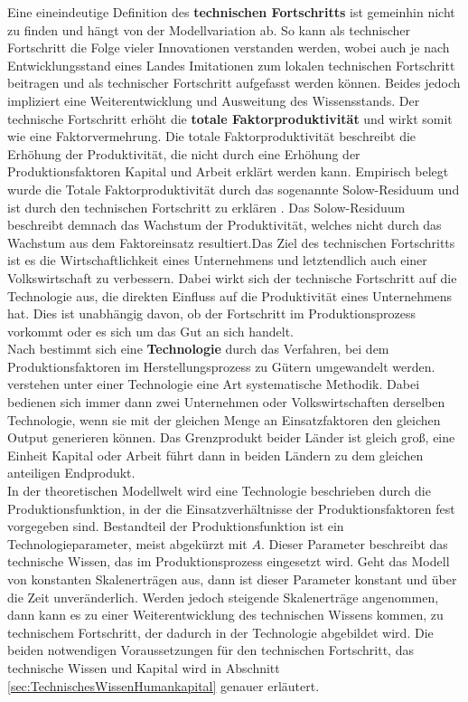 Eine eineindeutige Definition des \textbf{technischen Fortschritts} ist gemeinhin nicht zu finden und h{\"a}ngt von der Modellvariation ab. So kann als technischer Fortschritt die Folge vieler Innovationen verstanden werden, wobei auch je nach Entwicklungsstand eines Landes Imitationen zum lokalen technischen Fortschritt beitragen und als technischer Fortschritt aufgefasst werden können. Beides jedoch impliziert eine Weiterentwicklung und Ausweitung des Wissensstands. Der technische Fortschritt erhöht die \textbf{totale Faktorproduktivit{\"a}t} und wirkt somit wie eine Faktorvermehrung. Die totale Faktorproduktivität beschreibt die Erhöhung der Produktivität, die nicht durch eine Erhöhung der Produktionsfaktoren Kapital und Arbeit erklärt werden kann. Empirisch belegt wurde die Totale Faktorproduktivität durch das sogenannte Solow-Residuum und ist durch den technischen Fortschritt zu erklären \citep{Solow.1957}. Das Solow-Residuum beschreibt demnach das Wachstum der Produktivität, welches nicht durch das Wachstum aus dem Faktoreinsatz resultiert.\newline Das Ziel des technischen Fortschritts ist es die Wirtschaftlichkeit eines Unternehmens und letztendlich auch einer Volkswirtschaft zu verbessern. Dabei wirkt sich der technische Fortschritt auf die Technologie aus, die direkten Einfluss auf die Produktivit{\"a}t eines Unternehmens hat. Dies ist unabh{\"a}ngig davon, ob der Fortschritt im Produktionsprozess vorkommt oder es sich um das Gut an sich handelt.\\


Nach \citet[Kapitel 1]{Barro.2004} bestimmt sich eine \textbf{Technologie} durch das Verfahren, bei dem Produktionsfaktoren im Herstellungsprozess zu G{\"u}tern umgewandelt werden. \citet{Krugman.2015} verstehen unter einer Technologie eine Art systematische Methodik. Dabei bedienen sich immer dann zwei Unternehmen oder Volkswirtschaften derselben Technologie, wenn sie mit der gleichen Menge an Einsatzfaktoren den gleichen Output generieren k{\"o}nnen. Das Grenzprodukt beider Länder ist gleich gro{\ss}, eine Einheit Kapital oder Arbeit f{\"u}hrt dann in beiden L{\"a}ndern zu dem gleichen anteiligen Endprodukt.\\


In der theoretischen Modellwelt wird eine Technologie beschrieben durch die Produktionsfunktion, in der die Einsatzverh{\"a}ltnisse der Produktionsfaktoren fest vorgegeben sind. Bestandteil der Produktionsfunktion ist ein Technologieparameter, meist abgek{\"u}rzt mit $A$. Dieser Parameter beschreibt das technische Wissen, das im Produktionsprozess eingesetzt wird. Geht das Modell von konstanten Skalenertr{\"a}gen aus, dann ist dieser Parameter konstant und {\"u}ber die Zeit unver{\"a}nderlich. Werden jedoch steigende Skalenertr{\"a}ge angenommen, dann kann es zu einer Weiterentwicklung des technischen Wissens kommen, zu technischem Fortschritt, der dadurch in der Technologie abgebildet wird. Die beiden notwendigen Voraussetzungen für den technischen Fortschritt, das technische Wissen und Kapital wird in Abschnitt \ref{sec:TechnischesWissenHumankapital} genauer erläutert.\\


